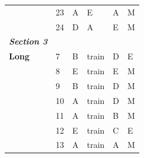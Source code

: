 \documentclass[pageno]{jpaper}
\newcommand{\textbi}[1]{\textbf{\textit{#1}}}
\begin{document}
\begin{table}[]
\begin{tabular}{@{}llllll@{}}
\textbf{}               & 23                                  & A                                          & E                                           & A                                           & M                                       \\
\textbf{}               & 24                                  & D                                          & A                                           & E                                           & M                                       \\ \midrule
\textbi{Section 3}      &                                     &                                            &                                             &                                             &                                         \\ \midrule
\textbf{Long}           & 7                                   & B                                          & train                                       & D                                           & E                                       \\
\textbf{}               & 8                                   & E                                          & train                                       & E                                           & M                                       \\
\textbf{}               & 9                                   & B                                          & train                                       & D                                           & M                                       \\
\textbf{}               & 10                                  & A                                          & train                                       & D                                           & M                                       \\
\textbf{}               & 11                                  & A                                          & train                                       & B                                           & M                                       \\
\textbf{}               & 12                                  & E                                          & train                                       & C                                           & E                                       \\
\textbf{}               & 13                                  & A                                          & train                                       & A                                           & M                                       \\

\end{tabular}
\end{table}
\end{document}
